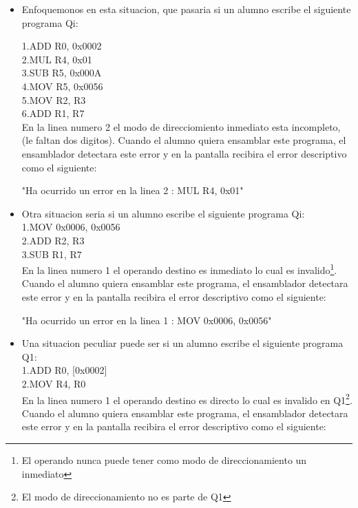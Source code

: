 \begin{itemize}

\item Enfoquemonos en esta situacion, que pasaria si un alumno escribe el siguiente programa Qi:

1.ADD R0, 0x0002 \\
2.MUL R4, 0x01\\
3.SUB R5, 0x000A\\
4.MOV R5, 0x0056\\
5.MOV R2, R3\\
6.ADD R1, R7\\

En la linea numero 2 el modo de direcciomiento inmediato esta incompleto, (le faltan dos digitos). Cuando el alumno quiera ensamblar este programa, el ensamblador detectara este error y en la pantalla recibira el error descriptivo como el siguiente:
 
"Ha ocurrido un error en la linea 2 : MUL R4, 0x01" \\  

\item Otra situacion seria si un alumno escribe el siguiente programa Qi:\\

1.MOV 0x0006, 0x0056\\
2.ADD R2, R3\\
3.SUB R1, R7\\

En la linea numero 1 el operando destino es inmediato lo cual es invalido\footnote{El operando nunca puede tener como modo de direccionamiento un inmediato}. Cuando el alumno quiera ensamblar este programa, el ensamblador detectara este error y en la pantalla recibira el error descriptivo como el siguiente:

"Ha ocurrido un error en la linea 1 : MOV 0x0006, 0x0056" \\

\item Una situacion peculiar puede ser si un alumno escribe el siguiente programa Q1:\\

1.ADD R0, [0x0002] \\
2.MOV R4, R0\\

En la linea numero 1 el operando destino es directo lo cual es invalido en Q1\footnote{El modo de direccionamiento no es parte de Q1}. Cuando el alumno quiera ensamblar este programa, el ensamblador detectara este error y en la pantalla recibira el error descriptivo como el siguiente:


\end{itemize}
